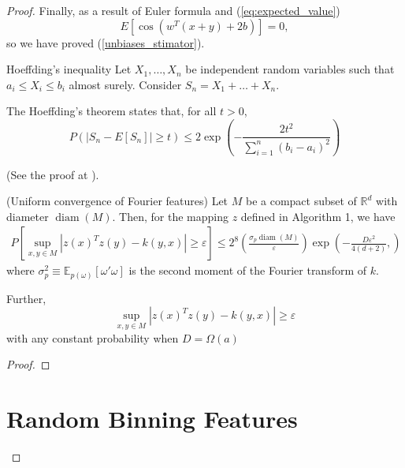 \begin{proof}
{Finally, as a result of Euler formula and (\ref{eq:expected_value})
\begin{equation}
    E\left[
        \cos\left(w^T (x+y) + 2b \right)
    \right]
    = 
    0, 
\end{equation}
so we have proved (\ref{unbiases_stimator}).
} %



\begin{theorem}{Hoeffding's inequality}
    Let $X_1, \ldots, X_n$ be independent random variables
    such that $a_i \leq X_i \leq b_i$ almost surely.
    Consider $S_n = X_1 +  \ldots + X_n$.

    The Hoeffding's theorem states that, for all $t>0$,
    \begin{equation}
        P\left(
            |S_n - E[S_n]| \geq t
        \right)
        \leq 
        2 \exp \left(
            - \frac{2 t^2}{\sum_{i=1}^n (b_i -a_i)^2}
        \right)
    \end{equation}
\end{theorem}
(See the proof at \cite{Hoeffding1994}). 



\begin{claim}
    (Uniform convergence of Fourier features) 
    Let $M$ be a compact subset of $\mathbb{R}^d$ with diameter $\operatorname{diam}(M)$. Then, for the mapping $z$ defined in Algorithm 1, we have
    \begin{align}
        P \left[
            \sup_{x,y \in M} |z(x)^T z(y) - k(y,x)|
            \geq \varepsilon
        \right]
        \leq 
        2^8
        \left(
            \frac{\sigma_p \operatorname{diam}(M)}{\varepsilon}
        \right)
        \exp \left(
            - \frac{D \varepsilon^2}{4(d+2)},
        \right)
    \end{align}
    where $\sigma_p^2 \equiv \mathbb{E}_{p(\omega)}[\omega' \omega]$ is the second moment of the Fourier transform of $k$.

    Further, 
    $$
    \sup_{x,y \in M} |z(x)^T z(y) - k(y,x)|
    \geq \varepsilon
    $$
    with any constant probability when $D = \Omega \left( a \right)$
\end{claim}

\begin{proof}
    

\end{proof}


\section{Random Binning Features}  


\end{proof}
